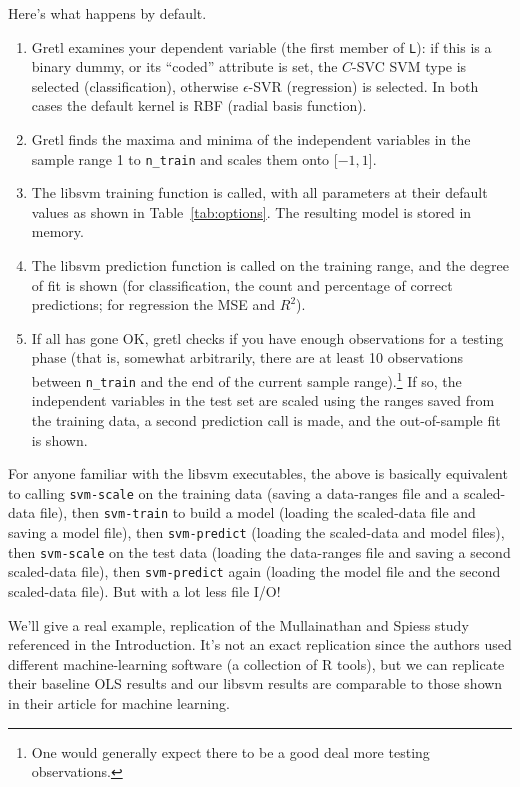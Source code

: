 \documentclass{article}
\begin{document}
Here's what happens by default.
\begin{enumerate}
\item Gretl examines your dependent variable (the first member of
  \texttt{L}): if this is a binary dummy, or its ``coded'' attribute
  is set, the $C$-SVC SVM type is selected (classification), otherwise
  $\epsilon$-SVR (regression) is selected. In both cases the default
  kernel is RBF (radial basis function).
\item Gretl finds the maxima and minima of the independent variables
  in the sample range 1 to \texttt{n\_train} and scales them onto
  [$-1,1$].
\item The \textsf{libsvm} training function is called, with all
  parameters at their default values as shown in
  Table~\ref{tab:options}. The resulting model is stored in memory.
\item The \textsf{libsvm} prediction function is called on the
  training range, and the degree of fit is shown (for classification,
  the count and percentage of correct predictions; for regression the
  MSE and $R^2$).
\item If all has gone OK, gretl checks if you have enough observations
  for a testing phase (that is, somewhat arbitrarily, there are at
  least 10 observations between \texttt{n\_train} and the end of the
  current sample range).\footnote{One would generally expect there to
    be a good deal more testing observations.} If so, the independent
  variables in the test set are scaled using the ranges saved from the
  training data, a second prediction call is made, and the
  out-of-sample fit is shown.
\end{enumerate}

For anyone familiar with the \textsf{libsvm} executables, the above is
basically equivalent to calling \texttt{svm-scale} on the training
data (saving a data-ranges file and a scaled-data file), then
\texttt{svm-train} to build a model (loading the scaled-data file and
saving a model file), then \texttt{svm-predict} (loading the
scaled-data and model files), then \texttt{svm-scale} on the test data
(loading the data-ranges file and saving a second scaled-data file),
then \texttt{svm-predict} again (loading the model file and the second
scaled-data file). But with a lot less file I/O!

We'll give a real example, replication of the Mullainathan and Spiess
study referenced in the Introduction. It's not an exact replication
since the authors used different machine-learning software (a
collection of \textsf{R} tools), but we can replicate their baseline
OLS results and our \textsf{libsvm} results are comparable to those
shown in their article for machine learning.
\end{document}
